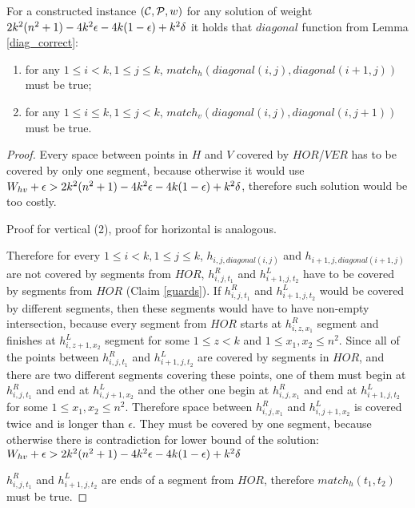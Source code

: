 \begin{lemma}
\label{vertical_horizontal_synchronized}
For a constructed instance $(\mathcal{C}, \mathcal{P}, w)$
for any solution of weight $2k^2(n^2+1) - 4k^2\epsilon -4k(1-\epsilon) +k^2\delta$ it holds that $diagonal$ function
from Lemma \ref{diag_correct}:
\begin{enumerate}
\item 
for any $1 \le i < k, 1 \le j \le k$,
$match_h(diagonal(i, j),diagonal(i+1, j))$ must be true;
\item 
for any $1 \le i \le k, 1 \le j < k$,
$match_v(diagonal(i, j),diagonal(i, j+1))$ must be true.
\end{enumerate}
\end{lemma}

\begin{proof}
Every space between points in $H$ and $V$ covered by $HOR$/$VER$
has to be covered by only one segment, because otherwise it would
use $W_{hv} + \epsilon > 2k^2(n^2+1) - 4k^2\epsilon -4k(1-\epsilon) +k^2\delta$,
therefore such solution would be too costly.

Proof for vertical (2), proof for horizontal is analogous.

Therefore for every $1 \le i < k, 1 \le j \le k$,
$h_{i,j,diagonal(i, j)}$ and $h_{i+1,j,diagonal(i+1, j)}$
are not covered by segments from $HOR$,
$h^R_{i,j,t_1}$ and $h^L_{i+1,j,t_2}$
have to be covered by segments from $HOR$ (Claim \ref{guards}).
If $h^R_{i,j,t_1}$ and $h^L_{i+1,j,t_2}$
would be covered by different segments,
then these segments would have to
have non-empty intersection,
because every segment from $HOR$ starts at $h^R_{i,z,x_1}$
segment and finishes at $h^L_{i,z+1,x_2}$ segment for some
$1 \le z < k$ and $1 \le x_1, x_2 \le n^2$.
Since all of the points between $h^R_{i,j,t_1}$ and $h^L_{i+1,j,t_2}$
are covered by segments in $HOR$,
and there are two different segments covering
these points, one of them must begin
at $h^R_{i,j,t_1}$ and end at $h^L_{i,j+1,x_2}$
and the other one begin at $h^R_{i,j,x_1}$
and end at $h^L_{i+1,j,t_2}$
for some $1 \le x_1, x_2 \le n^2$.
Therefore space between $h^R_{i,j,x_1}$ and $h^L_{i,j+1,x_2}$
is covered twice and is longer than $\epsilon$.
They must be covered by one segment,
because otherwise there is contradiction
for lower bound of the solution:
$W_{hv} + \epsilon > 2k^2(n^2+1) - 4k^2\epsilon -4k(1-\epsilon) +k^2\delta$

$h^R_{i,j,t_1}$ and $h^L_{i+1,j,t_2}$
are ends of a segment from $HOR$,
therefore $match_h(t_1,t_2)$ must be true.
\end{proof}

